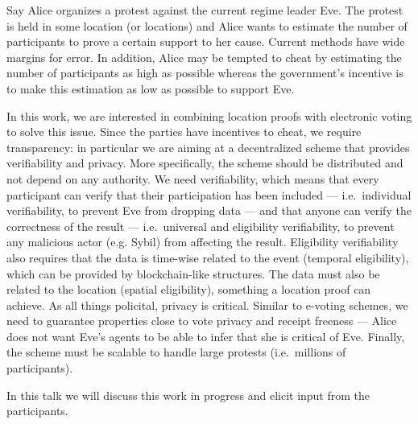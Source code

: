 Say Alice organizes a protest against the current regime leader Eve.
The protest is held in some location (or locations) and Alice wants to estimate 
the number of participants to prove a certain support to her cause.
Current methods have wide margins for error.
In addition, Alice may be tempted to cheat by estimating the number of 
participants as high as possible whereas the government's incentive is to make 
this estimation as low as possible to support Eve.
                                                                                  
In this work, we are interested in combining location proofs with electronic 
voting to solve this issue.
Since the parties have incentives to cheat, we require transparency: in 
particular we are aiming at a decentralized scheme that provides verifiability 
and privacy.
More specifically, the scheme should be distributed and not depend on any 
authority.
We need verifiability, which means that every participant can verify that their 
participation has been included --- i.e.\ individual verifiability, to prevent 
Eve from dropping data --- and that anyone can verify the correctness of the 
result --- i.e.\ universal and eligibility verifiability, to prevent any 
malicious actor (e.g. Sybil) from affecting the result.
Eligibility verifiability also requires that the data is time-wise related to 
the event (temporal eligibility), which can be provided by blockchain-like 
structures.
The data must also be related to the location (spatial eligibility), something 
a location proof can achieve.
As all things policital, privacy is critical.
Similar to e-voting schemes, we need to guarantee properties close to vote 
privacy and receipt freeness --- Alice does not want Eve's agents to be able to 
infer that she is critical of Eve.
Finally, the scheme must be scalable to handle large protests (i.e.\ millions 
of participants).

In this talk we will discuss this work in progress and elicit input from the
participants.
